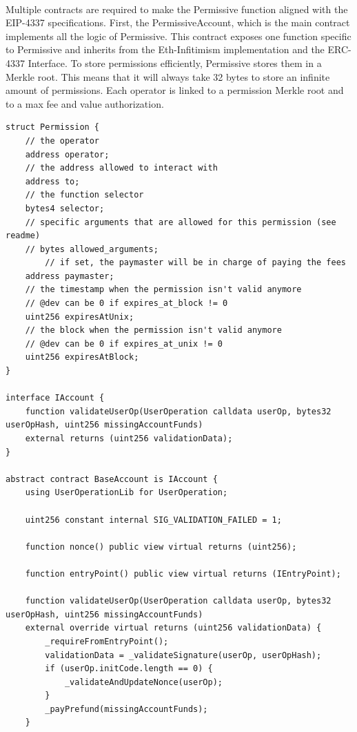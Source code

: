 \documentclass{article}
\begin{document}
\paragraph{}
Multiple contracts are required to make the Permissive function aligned with the EIP-4337 specifications. First, the PermissiveAccount, which is the main contract implements all the logic of Permissive. This contract exposes one function specific to Permissive and inherits from the Eth-Infitimism implementation and the ERC-4337 Interface. To store permissions efficiently, Permissive stores them in a Merkle root. This means that it will always take 32 bytes to store an infinite amount of permissions. Each operator is linked to a permission Merkle root and to a max fee and value authorization.
\begin{lstlisting}[language=Solidity]
struct Permission {
    // the operator
    address operator;
    // the address allowed to interact with
    address to;
    // the function selector
    bytes4 selector;
    // specific arguments that are allowed for this permission (see readme)
    // bytes allowed_arguments;
		// if set, the paymaster will be in charge of paying the fees
    address paymaster;
    // the timestamp when the permission isn't valid anymore
    // @dev can be 0 if expires_at_block != 0
    uint256 expiresAtUnix;
    // the block when the permission isn't valid anymore
    // @dev can be 0 if expires_at_unix != 0
    uint256 expiresAtBlock;
}

interface IAccount {
    function validateUserOp(UserOperation calldata userOp, bytes32 userOpHash, uint256 missingAccountFunds)
    external returns (uint256 validationData);
}

abstract contract BaseAccount is IAccount {
    using UserOperationLib for UserOperation;

    uint256 constant internal SIG_VALIDATION_FAILED = 1;

    function nonce() public view virtual returns (uint256);

    function entryPoint() public view virtual returns (IEntryPoint);

    function validateUserOp(UserOperation calldata userOp, bytes32 userOpHash, uint256 missingAccountFunds)
    external override virtual returns (uint256 validationData) {
        _requireFromEntryPoint();
        validationData = _validateSignature(userOp, userOpHash);
        if (userOp.initCode.length == 0) {
            _validateAndUpdateNonce(userOp);
        }
        _payPrefund(missingAccountFunds);
    }


\end{lstlisting}
\end{document}
